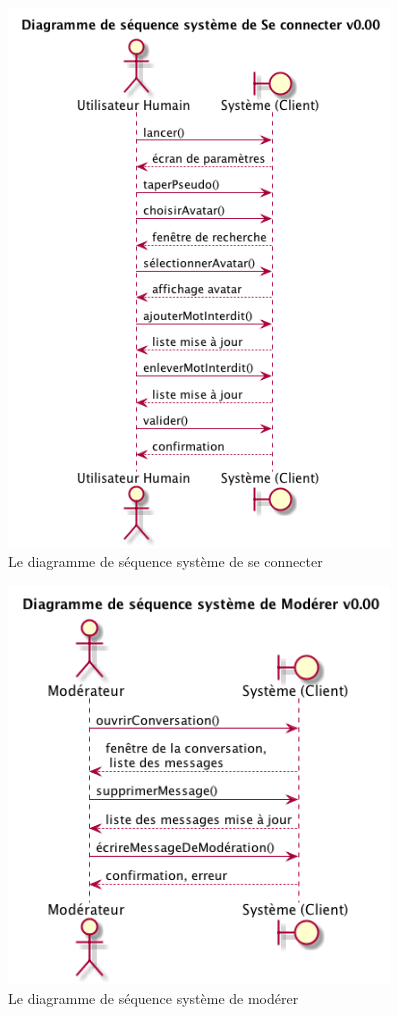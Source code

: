 \documentclass[11pt,dvipsnames,svgnames]{report}
\begin{document}
\begin{figure}[H]
\centerline{\includegraphics[width=0.9\textwidth]{diagrammes/dss-connexion.png}}
\caption{Le diagramme de séquence système de \og se connecter \fg}
\end{figure}

\begin{figure}[H]
\centerline{\includegraphics[width=0.9\textwidth]{diagrammes/dss-moderer.png}}
\caption{Le diagramme de séquence système de \og modérer \fg}
\end{figure}
\end{document}
